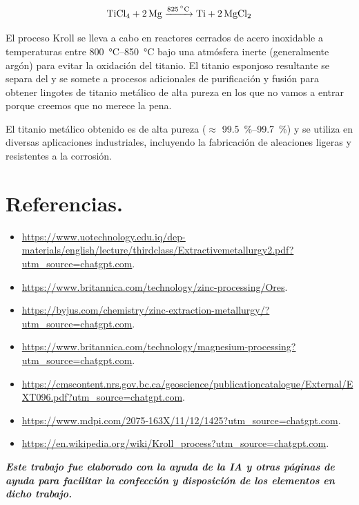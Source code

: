 \documentclass[12pt,a4paper]{article}
\begin{document}
\[ \ce{TiCl4 + 2Mg ->[\text{\SI{825}{\celsius}}] Ti + 2MgCl2}\]

El proceso Kroll se lleva a cabo en reactores cerrados de acero inoxidable a temperaturas entre \SIrange[range-phrase = { - }, range-units=single]{800}{850}{\celsius} bajo una atmósfera inerte (generalmente argón) para evitar la oxidación del titanio. El titanio esponjoso resultante se separa del  y se somete a procesos adicionales de purificación y fusión para obtener lingotes de titanio metálico de alta pureza en los que no vamos a entrar porque creemos que no merece la pena.

El titanio metálico obtenido es de alta pureza ($\approx$ \SIrange[range-phrase = { - }, range-units=single]{99,5}{99,7}{\percent}) y se utiliza en diversas aplicaciones industriales, incluyendo la fabricación de aleaciones ligeras y resistentes a la corrosión.

\section{Referencias.}

\begin{itemize}
    \item \url{https://www.uotechnology.edu.iq/dep-materials/english/lecture/thirdclass/Extractivemetallurgy2.pdf?utm_source=chatgpt.com}.
    \item \url{https://www.britannica.com/technology/zinc-processing/Ores}.
    \item \url{https://byjus.com/chemistry/zinc-extraction-metallurgy/?utm_source=chatgpt.com}.
    \item \url{https://www.britannica.com/technology/magnesium-processing?utm_source=chatgpt.com}.
    \item \url{https://cmscontent.nrs.gov.bc.ca/geoscience/publicationcatalogue/External/EXT096.pdf?utm_source=chatgpt.com}.
    \item \url{https://www.mdpi.com/2075-163X/11/12/1425?utm_source=chatgpt.com}.
    \item \url{https://en.wikipedia.org/wiki/Kroll_process?utm_source=chatgpt.com}.
\end{itemize}

\vfill
\textit{\textbf{Este trabajo fue elaborado con la ayuda de la IA y otras páginas de ayuda para facilitar la confección y disposición de los elementos en dicho trabajo.}}
\end{document}
